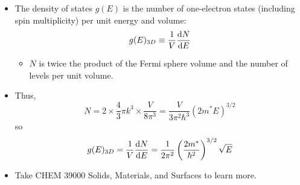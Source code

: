 \documentclass[../notes.tex]{subfiles}
\begin{document}
\begin{itemize}
\begin{itemize}
        \item The density of states $g(E)$ is the number of one-electron states (including spin multiplicity) per unit energy and volume:
        \begin{equation*}
            g(E)_{3D} \equiv \frac{1}{V}\dv{N}{E}
        \end{equation*}
        \begin{itemize}
            \item $N$ is twice the product of the Fermi sphere volume and the number of levels per unit volume.
        \end{itemize}
        \item Thus,
        \begin{equation*}
            N = 2\times\frac{4}{3}\pi k^3\times\frac{V}{8\pi^3} = \frac{V}{3\pi^2\hbar^3}(2m^*E)^{3/2}
        \end{equation*}
        so
        \begin{equation*}
            g(E)_{3D} = \frac{1}{V}\dv{N}{E} = \frac{1}{2\pi^2}\left( \frac{2m^*}{\hbar^2} \right)^{3/2}\sqrt{E}
        \end{equation*}
        \item Take CHEM 39000 Solids, Materials, and Surfaces to learn more.
    \end{itemize}
\end{itemize}
\end{document}
